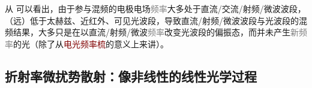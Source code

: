 从  可以看出，由于参与混频的电极电场\textcolor{gray}{频率}大多处于\textcolor{NavyBlue}{直流}/\textcolor{NavyBlue}{交流}/\textcolor{NavyBlue}{射频}/\textcolor{NavyBlue}{微波}波段，（远）低于\textcolor{NavyBlue}{太赫兹}、\textcolor{NavyBlue}{近红外}、\textcolor{NavyBlue}{可见光}波段，导致\textcolor{NavyBlue}{直流}/\textcolor{NavyBlue}{射频}/\textcolor{NavyBlue}{微波}波段与\textcolor{NavyBlue}{光波段}的混频结果，大多只是在以\textcolor{NavyBlue}{直流}/\textcolor{NavyBlue}{射频}/\textcolor{NavyBlue}{微波}\textcolor{gray}{频率}改变\textcolor{NavyBlue}{光波段}的\textcolor{PineGreen}{偏振态}，而并未产生\textcolor{gray}{新频率}的\textcolor{NavyBlue}{光}（除了从\textcolor{Maroon}{电光频率梳}的意义上来讲）。

\subsection{折射率微扰势散射：像非线性的线性光学过程}\label{ssec:holo_L=NO_that_sim_LO}


